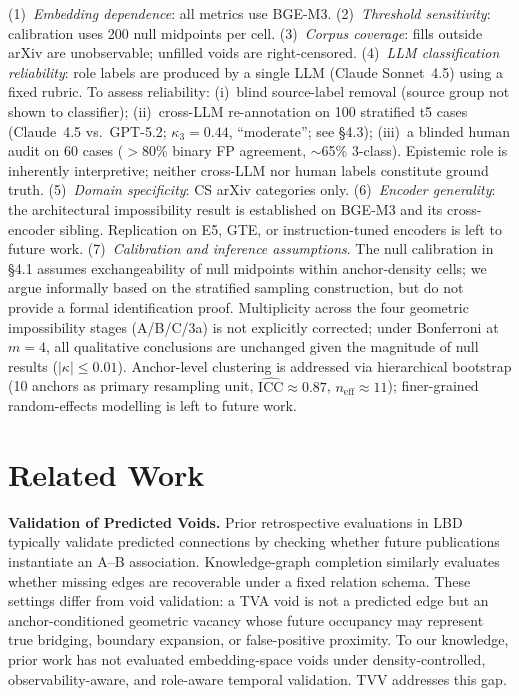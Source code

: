 \documentclass[11pt,twocolumn]{article}
\newcommand{\tva}{\textsf{TVA}}
\newcommand{\tvv}{\textsf{TVV}}
\begin{document}
(1)~\emph{Embedding dependence}: all metrics use BGE-M3.
(2)~\emph{Threshold sensitivity}: calibration uses 200 null midpoints per cell.
(3)~\emph{Corpus coverage}: fills outside arXiv are unobservable; unfilled voids are right-censored.
(4)~\emph{LLM classification reliability}: role labels are produced by a single LLM
(Claude Sonnet~4.5) using a fixed rubric. To assess reliability: (i)~blind
source-label removal (source group not shown to classifier); (ii)~cross-LLM
re-annotation on 100 stratified t5 cases (Claude~4.5 vs.\ GPT-5.2;
$\kappa_3{=}0.44$, ``moderate''; see \S4.3); (iii)~a blinded human audit on
60 cases ($>$80\% binary FP agreement, $\sim$65\% 3-class). Epistemic role is
inherently interpretive; neither cross-LLM nor human labels constitute ground truth.
(5)~\emph{Domain specificity}: CS arXiv categories only.
(6)~\emph{Encoder generality}: the architectural impossibility result is established
on BGE-M3 and its cross-encoder sibling. Replication on E5, GTE, or
instruction-tuned encoders is left to future work.
(7)~\emph{Calibration and inference assumptions}. The null calibration in \S4.1
assumes exchangeability of null midpoints within anchor-density cells; we argue
informally based on the stratified sampling construction, but do not provide a
formal identification proof. Multiplicity across the four geometric impossibility
stages (A/B/C/3a) is not explicitly corrected; under Bonferroni at $m{=}4$, all
qualitative conclusions are unchanged given the magnitude of null results
($|\kappa|{\leq}0.01$). Anchor-level clustering is addressed via hierarchical
bootstrap (10 anchors as primary resampling unit,
$\widehat{\mathrm{ICC}}{\approx}0.87$, $n_\mathrm{eff}{\approx}11$); finer-grained
random-effects modelling is left to future work.

\section{Related Work}

\textbf{Validation of Predicted Voids.}
Prior retrospective evaluations in LBD~\cite{swanson1986fish,gordon1996using,weeber2001using}
typically validate predicted connections by checking whether future publications instantiate
an A--B association. Knowledge-graph completion similarly evaluates whether missing edges
are recoverable under a fixed relation schema. These settings differ from void validation:
a \tva{} void is not a predicted edge but an anchor-conditioned geometric vacancy whose
future occupancy may represent true bridging, boundary expansion, or false-positive
proximity. To our knowledge, prior work has not evaluated embedding-space voids under
density-controlled, observability-aware, and role-aware temporal validation. \tvv{}
addresses this gap.
\end{document}
